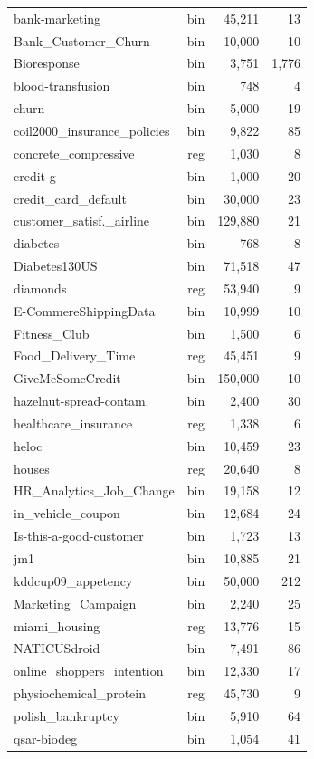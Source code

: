 \documentclass[sigconf]{acmart}%
\begin{document}
\begin{table}[t]
\begin{tabular}[t]{@{}l c r r@{}}
bank-marketing & bin & 45,211 & 13 \\
Bank\_Customer\_Churn & bin & 10,000 & 10 \\
Bioresponse & bin & 3,751 & 1,776 \\
blood-transfusion & bin & 748 & 4 \\
churn & bin & 5,000 & 19 \\
coil2000\_insurance\_policies & bin & 9,822 & 85 \\
concrete\_compressive & reg & 1,030 & 8 \\
credit-g & bin & 1,000 & 20 \\
credit\_card\_default & bin & 30,000 & 23 \\
customer\_satisf.\_airline & bin & 129,880 & 21 \\
diabetes & bin & 768 & 8 \\
Diabetes130US & bin & 71,518 & 47 \\
diamonds & reg & 53,940 & 9 \\
E-CommereShippingData & bin & 10,999 & 10 \\
Fitness\_Club & bin & 1,500 & 6 \\
Food\_Delivery\_Time & reg & 45,451 & 9 \\
GiveMeSomeCredit & bin & 150,000 & 10 \\
hazelnut-spread-contam. & bin & 2,400 & 30 \\
healthcare\_insurance & reg & 1,338 & 6 \\
heloc & bin & 10,459 & 23 \\
houses & reg & 20,640 & 8 \\
HR\_Analytics\_Job\_Change & bin & 19,158 & 12 \\
in\_vehicle\_coupon & bin & 12,684 & 24 \\
Is-this-a-good-customer & bin & 1,723 & 13 \\
jm1 & bin & 10,885 & 21 \\
kddcup09\_appetency & bin & 50,000 & 212 \\
Marketing\_Campaign & bin & 2,240 & 25 \\
miami\_housing & reg & 13,776 & 15 \\
NATICUSdroid & bin & 7,491 & 86 \\
online\_shoppers\_intention & bin & 12,330 & 17 \\
physiochemical\_protein & reg & 45,730 & 9 \\
polish\_bankruptcy & bin & 5,910 & 64 \\
qsar-biodeg & bin & 1,054 & 41 \\

\end{tabular}
\end{table}
\end{document}
